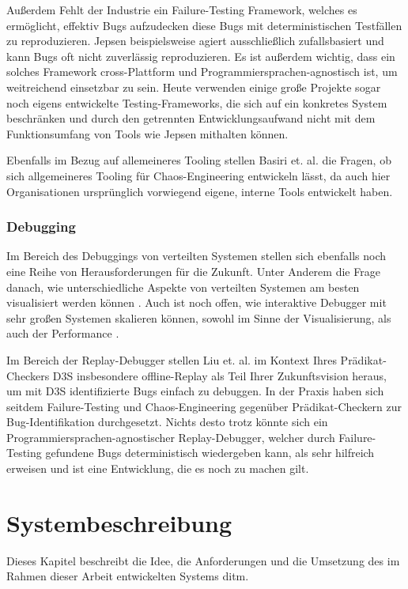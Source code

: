 \documentclass[12pt,a4paper]{report}
\begin{document}
Außerdem Fehlt der Industrie ein Failure-Testing Framework, welches es ermöglicht, effektiv Bugs aufzudecken diese Bugs mit
deterministischen Testfällen zu reproduzieren. Jepsen beispielsweise agiert ausschließlich zufallsbasiert und kann Bugs oft nicht
zuverlässig reproduzieren. Es ist außerdem wichtig, dass ein solches Framework cross-Plattform und Programmiersprachen-agnostisch
ist, um weitreichend einsetzbar zu sein. Heute verwenden einige große Projekte sogar noch eigens entwickelte Testing-Frameworks,
die sich auf ein konkretes System beschränken und durch den getrennten Entwicklungsaufwand nicht mit dem Funktionsumfang von Tools
wie Jepsen mithalten können. \cite{failify_masters_thesis}

Ebenfalls im Bezug auf allemeineres Tooling stellen Basiri et. al. \cite{chaos_engineering} die Fragen, ob sich allgemeineres
Tooling für Chaos-Engineering entwickeln lässt, da auch hier Organisationen ursprünglich vorwiegend eigene, interne Tools
entwickelt haben.

\subsection{Debugging}
Im Bereich des Debuggings von verteilten Systemen stellen sich ebenfalls noch eine Reihe von Herausforderungen für die Zukunft.
Unter Anderem die Frage danach, wie unterschiedliche Aspekte von verteilten Systemen am besten visualisiert werden können
\cite{oddity_graphical_debugger}. Auch ist noch offen, wie interaktive Debugger mit sehr großen Systemen skalieren können, sowohl
im Sinne der Visualisierung, als auch der Performance \cite{gotcha_interactive_debugger}.

Im Bereich der Replay-Debugger stellen Liu et. al. \cite{d3s_predicate_checker} im Kontext Ihres Prädikat-Checkers D3S
insbesondere offline-Replay als Teil Ihrer Zukunftsvision heraus, um mit D3S identifizierte Bugs einfach zu debuggen. In der
Praxis haben sich seitdem Failure-Testing und Chaos-Engineering gegenüber Prädikat-Checkern zur Bug-Identifikation durchgesetzt.
Nichts desto trotz könnte sich ein Programmiersprachen-agnostischer Replay-Debugger, welcher durch Failure-Testing gefundene Bugs
deterministisch wiedergeben kann, als sehr hilfreich erweisen und ist eine Entwicklung, die es noch zu machen gilt.



\chapter{Systembeschreibung}
Dieses Kapitel beschreibt die Idee, die Anforderungen und die Umsetzung des im Rahmen dieser Arbeit entwickelten Systems ditm.
\end{document}

